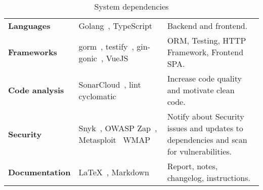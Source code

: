 \begin{table}
{\begin{tabular}{| p{0.235\linewidth} | p{0.375\linewidth} | p{0.565\linewidth}|}
            \textbf{Languages} & Golang~\cite{tool:go}, TypeScript~\cite{tool:typescript} & Backend and frontend. \\ 
            \textbf{Frameworks} & gorm~\cite{gorm}, testify~\cite{tool:testify}, gin-gonic~\cite{tool:gin}, VueJS~\cite{tool:vue} & ORM, Testing, HTTP Framework, Frontend SPA. \\
            \textbf{Code analysis} & SonarCloud~\cite{tool:sonarcloud}, lint~\cite{tool:golang-lint} cyclomatic~\cite{tool:go-cyclo} & Increase code quality and motivate clean code. \\
            \textbf{Security} & Snyk~\cite{snyk}, OWASP Zap~\cite{tool:owasp-zap}, Metasploit~\cite{metasploit} WMAP~\cite{metasploit-wmap} & Notify about Security issues and updates to dependencies and scan for vulnerabilities. \\

            \textbf{Documentation} & LaTeX~\cite{tool:latex}, Markdown~\cite{tool:markdown} & Report, notes, changelog, instructions. \\


            \hline

        
        \end{tabular}    
    }

    \caption{System dependencies}
    \label{fig:System dependencies}
\end{table}